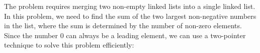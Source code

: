 \documentclass[preview]{standalone}
\begin{document}
The problem requires merging two non-empty linked lists into a single linked list.\\In this problem, we need to find the sum of the two largest non-negative numbers in the list, where the sum is determined by the number of non-zero elements.\\Since the number 0 can always be a leading element, we can use a two-pointer technique to solve this problem efficiently:\\
\end{document}

